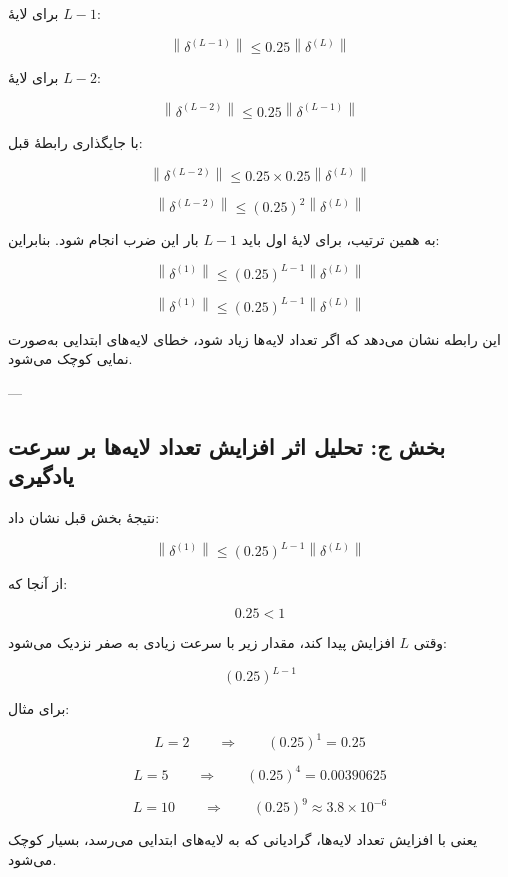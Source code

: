 \documentclass[12pt,a4paper]{article}
\begin{document}
برای لایهٔ \(L-1\):

\[
\left\|\delta^{(L-1)}\right\|
\leq
0.25
\left\|\delta^{(L)}\right\|
\]

برای لایهٔ \(L-2\):

\[
\left\|\delta^{(L-2)}\right\|
\leq
0.25
\left\|\delta^{(L-1)}\right\|
\]

با جایگذاری رابطهٔ قبل:

\[
\left\|\delta^{(L-2)}\right\|
\leq
0.25 \times 0.25
\left\|\delta^{(L)}\right\|
\]

\[
\left\|\delta^{(L-2)}\right\|
\leq
(0.25)^2
\left\|\delta^{(L)}\right\|
\]

به همین ترتیب، برای لایهٔ اول باید \(L-1\) بار این ضرب انجام شود. بنابراین:

\[
\left\|\delta^{(1)}\right\|
\leq
(0.25)^{L-1}
\left\|\delta^{(L)}\right\|
\]

\begin{tcolorbox}[
	colback=softorange,
	colframe=golden,
	title=نتیجهٔ اصلی بخش ب,
	coltitle=black
	]
	\[
	\boxed{
		\left\|\delta^{(1)}\right\|
		\leq
		(0.25)^{L-1}
		\left\|\delta^{(L)}\right\|
	}
	\]
	
	این رابطه نشان می‌دهد که اگر تعداد لایه‌ها زیاد شود، خطای لایه‌های ابتدایی به‌صورت نمایی کوچک می‌شود.
\end{tcolorbox}

---

\subsection{بخش ج: تحلیل اثر افزایش تعداد لایه‌ها بر سرعت یادگیری}

نتیجهٔ بخش قبل نشان داد:

\[
\left\|\delta^{(1)}\right\|
\leq
(0.25)^{L-1}
\left\|\delta^{(L)}\right\|
\]

از آنجا که:

\[
0.25 < 1
\]

وقتی \(L\) افزایش پیدا کند، مقدار زیر با سرعت زیادی به صفر نزدیک می‌شود:

\[
(0.25)^{L-1}
\]

برای مثال:

\[
L=2
\qquad\Longrightarrow\qquad
(0.25)^{1}=0.25
\]

\[
L=5
\qquad\Longrightarrow\qquad
(0.25)^{4}=0.00390625
\]

\[
L=10
\qquad\Longrightarrow\qquad
(0.25)^{9}\approx 3.8\times 10^{-6}
\]

یعنی با افزایش تعداد لایه‌ها، گرادیانی که به لایه‌های ابتدایی می‌رسد، بسیار کوچک می‌شود.
\end{document}
